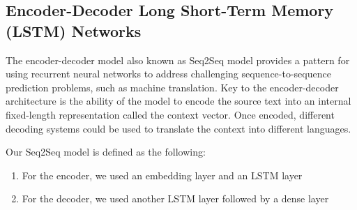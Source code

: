 \documentclass[runningheads]{llncs}
\begin{document}
	\subsection{Encoder-Decoder Long Short-Term Memory (LSTM) Networks}	
	The encoder-decoder model also known as Seq2Seq model provides a pattern for using recurrent neural networks to address challenging sequence-to-sequence prediction problems, such as machine translation.
	Key to the encoder-decoder architecture is the ability of the model to encode the source text into an internal fixed-length representation called the context vector. Once encoded, different decoding systems could be used to translate the context into different languages.

	\begin{minipage}{\linewidth}
		\begin{center}
			\hspace*{-.25in}
  			 \noindent{}
			\label{fig:Sequence to Sequence Model}
		\end{center}
	\end{minipage}
	\afterpage{\clearpage}
	
	Our Seq2Seq model is defined as the following:
	
	\begin{enumerate}
		\item For the encoder, we used an embedding layer and an LSTM layer
		\item For the decoder, we used another LSTM layer followed by a dense layer
	\end{enumerate}
	
\end{document}
